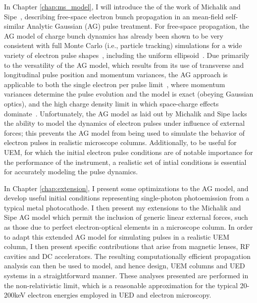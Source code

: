 In Chapter \ref{chap:ms_model}, I will introduce the of the work of Michalik and Sipe~\cite{michalik_analytic_2006,michalik_erratum:_2008}, describing free-space electron bunch propagation in an mean-field self-similar Analytic Gaussian (AG) pulse treatment.
For free-space propagation, the AG model of charge bunch dynamics has already been shown to be very consistent with full Monte Carlo (i.e., particle tracking) simulations for a wide variety of electron pulse shapes~\cite{michalik_analytic_2006,michalik_evolution_2009}, including the uniform ellipsoid~\cite{luiten_how_2004}.
Due primarily to the versatility of the AG model, which results from its use of transverse and longitudinal pulse position and momentum variances, the AG approach is applicable to both the single electron per pulse limit~\cite{lobastov_four-dimensional_2005}, where momentum variances determine the pulse evolution and the model is exact (obeying Gaussian optics), and the high charge density limit in which space-charge effects dominate~\cite{luiten_how_2004,siwick_ultrafast_2002,cao_femtosecond_2003}.
Unfortunately, the AG model as laid out by Michalik and Sipe lacks the ability to model the dynamics of electron pulses under influence of external forces; this prevents the AG model from being used to simulate the behavior of electron pulses in realistic microscope columns.
Additionally, to be useful for UEM, for which the initial electron pulse conditions are of notable importance for the performance of the instrument, a realistic set of intial conditions is essential for accurately modeling the pulse dynamics.

In Chapter \ref{chap:extension}, I present some optimizations to the AG model, and develop useful initial conditions representing single-photon photoemission from a typical metal photocathode.
I then present my extensions to the Michalik and Sipe AG model which permit the inclusion of generic linear external forces, such as those due to perfect electron-optical elements in a microscope column.
In order to adapt this extended AG model for simulating pulses in a realistic UEM column, I then present specific contributions that arise from magnetic lenses, RF cavities and DC accelerators.
The resulting computationally efficient propagation analysis can then be used to model, and hence design, UEM columns and UED systems in a straightforward manner.
These analyses presented are performed in the non-relativistic limit, which is a reasonable approximation for the typical 20-200keV electron energies employed in UED and electron microscopy.


